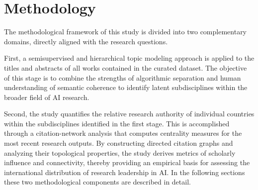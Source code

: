 \documentclass{article}
\begin{document}




\section{Methodology}

The methodological framework of this study is divided into two complementary domains, directly aligned with the research questions. 

First, a semisupervised and hierarchical topic modeling approach is applied to the titles and abstracts of all works contained in the curated dataset. The objective of this stage is to combine the strengths of algorithmic separation and human understanding of semantic coherence to identify latent subdisciplines within the broader field of AI research.

Second, the study quantifies the relative research authority of individual countries within the subdisciplines identified in the first stage. This is accomplished through a citation-network analysis that computes centrality measures for the most recent research outputs. By constructing directed citation graphs and analyzing their topological properties, the study derives metrics of scholarly influence and connectivity, thereby providing an empirical basis for assessing the international distribution of research leadership in AI. In the following sections these two methodological components are described in detail.
\end{document}
